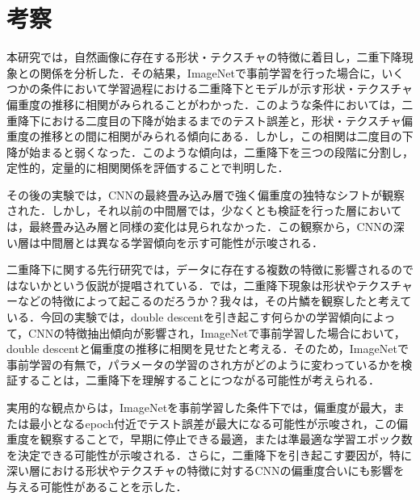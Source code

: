 \chapter{考察}
本研究では，自然画像に存在する形状・テクスチャの特徴に着目し，二重下降現象との関係を分析した．その結果，ImageNetで事前学習を行った場合に，いくつかの条件において学習過程における二重降下とモデルが示す形状・テクスチャ偏重度の推移に相関がみられることがわかった．このような条件においては，二重降下における二度目の下降が始まるまでのテスト誤差と，形状・テクスチャ偏重度の推移との間に相関がみられる傾向にある．しかし，この相関は二度目の下降が始まると弱くなった．このような傾向は，二重降下を三つの段階に分割し，定性的，定量的に相関関係を評価することで判明した．

その後の実験では，CNNの最終畳み込み層で強く偏重度の独特なシフトが観察された．しかし，それ以前の中間層では，少なくとも検証を行った層においては，最終畳み込み層と同様の変化は見られなかった．この観察から，CNNの深い層は中間層とは異なる学習傾向を示す可能性が示唆される．

二重降下に関する先行研究では，データに存在する複数の特徴に影響されるのではないかという仮説が提唱されている．では，二重降下現象は形状やテクスチャーなどの特徴によって起こるのだろうか？我々は，その片鱗を観察したと考えている．今回の実験では，double descentを引き起こす何らかの学習傾向によって，CNNの特徴抽出傾向が影響され，ImageNetで事前学習した場合において，double descentと偏重度の推移に相関を見せたと考える．そのため，ImageNetで事前学習の有無で，パラメータの学習のされ方がどのように変わっているかを検証することは，二重降下を理解することにつながる可能性が考えられる．

実用的な観点からは，ImageNetを事前学習した条件下では，偏重度が最大，または最小となるepoch付近でテスト誤差が最大になる可能性が示唆され，この偏重度を観察することで，早期に停止できる最適，または準最適な学習エポック数を決定できる可能性が示唆される．さらに，二重降下を引き起こす要因が，特に深い層における形状やテクスチャの特徴に対するCNNの偏重度合いにも影響を与える可能性があることを示した．

